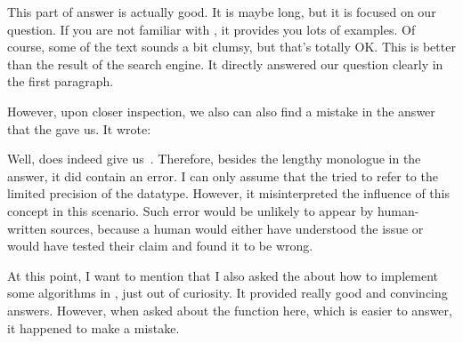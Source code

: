 This part of answer is actually good.
It is maybe long, but it is focused on our question.
If you are not familiar with , it provides you lots of examples.
Of course, some of the text sounds a bit clumsy, but that's totally OK.
This is better than the result of the search engine.
It directly answered our question clearly in the first paragraph.

However, upon closer inspection, we also can also find a mistake in the answer that the  gave us.
It wrote:
%
\begin{quotation}{}\end{quotation}%
%
Well,  does indeed give us~.
Therefore, besides the lengthy monologue in the answer, it did contain an error.
I can only assume that the  tried to refer to the limited precision of the  datatype.
However, it misinterpreted the influence of this concept in this scenario.
Such error would be unlikely to appear by human-written sources, because a human would either have understood the issue or would have tested their claim and found it to be wrong.

At this point, I want to mention that I also asked the  about how to implement some algorithms in \python, just out of curiosity.
It provided really good and convincing answers.
However, when asked about the  function here, which is easier to answer, it happened to make a mistake.

